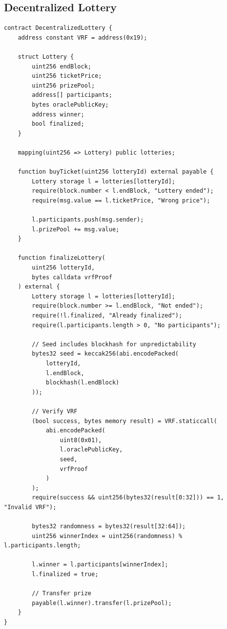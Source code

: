 \documentclass[11pt,a4paper]{article}
\theoremstyle{definition}
\begin{document}
\subsection{Decentralized Lottery}

\begin{lstlisting}[language=Solidity]
contract DecentralizedLottery {
    address constant VRF = address(0x19);

    struct Lottery {
        uint256 endBlock;
        uint256 ticketPrice;
        uint256 prizePool;
        address[] participants;
        bytes oraclePublicKey;
        address winner;
        bool finalized;
    }

    mapping(uint256 => Lottery) public lotteries;

    function buyTicket(uint256 lotteryId) external payable {
        Lottery storage l = lotteries[lotteryId];
        require(block.number < l.endBlock, "Lottery ended");
        require(msg.value == l.ticketPrice, "Wrong price");

        l.participants.push(msg.sender);
        l.prizePool += msg.value;
    }

    function finalizeLottery(
        uint256 lotteryId,
        bytes calldata vrfProof
    ) external {
        Lottery storage l = lotteries[lotteryId];
        require(block.number >= l.endBlock, "Not ended");
        require(!l.finalized, "Already finalized");
        require(l.participants.length > 0, "No participants");

        // Seed includes blockhash for unpredictability
        bytes32 seed = keccak256(abi.encodePacked(
            lotteryId,
            l.endBlock,
            blockhash(l.endBlock)
        ));

        // Verify VRF
        (bool success, bytes memory result) = VRF.staticcall(
            abi.encodePacked(
                uint8(0x01),
                l.oraclePublicKey,
                seed,
                vrfProof
            )
        );
        require(success && uint256(bytes32(result[0:32])) == 1, "Invalid VRF");

        bytes32 randomness = bytes32(result[32:64]);
        uint256 winnerIndex = uint256(randomness) % l.participants.length;

        l.winner = l.participants[winnerIndex];
        l.finalized = true;

        // Transfer prize
        payable(l.winner).transfer(l.prizePool);
    }
}
\end{lstlisting}
\end{document}
